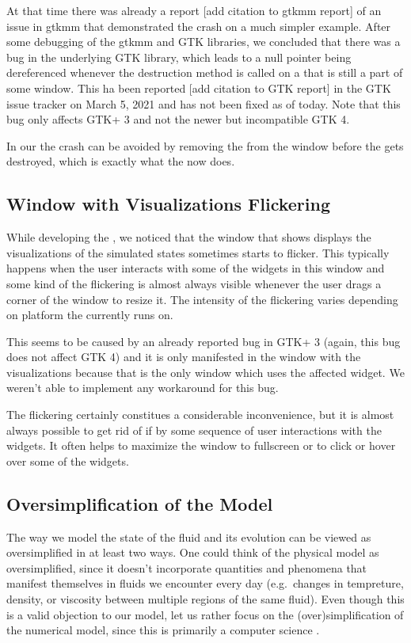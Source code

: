 \documentclass[11pt,a4paper,twoside,openright]{report}
\begin{document}
At that time there was already a report [add citation to gtkmm report] of an issue in gtkmm that demonstrated the crash on a much simpler example. After some debugging of the gtkmm and GTK libraries, we concluded that there was a bug in the underlying GTK library, which leads to a null pointer being dereferenced whenever the destruction method is called on a  that is still a part of some window. This ha been reported [add citation to GTK report] in the GTK issue tracker on March 5, 2021 and has not been fixed as of today. Note that this bug only affects GTK+ 3 and not the newer but incompatible GTK 4.

In our \software{} the crash can be avoided by removing the  from the window before the  gets destroyed, which is exactly what the \software{} now does.

\subsection{Window with Visualizations Flickering}
While developing the \software{}, we noticed that the window that shows displays the visualizations of the simulated states sometimes starts to flicker. This typically happens when the user interacts with some of the widgets in this window and some kind of the flickering is almost always visible whenever the user drags a corner of the window to resize it. The intensity of the flickering varies depending on platform the \software{} currently runs on.

This seems to be caused by an already reported bug in GTK+ 3 (again, this bug does not affect GTK 4) and it is only manifested in the window with the visualizations because that is the only window which uses the affected  widget. We weren't able to implement any workaround for this bug.

The flickering certainly constitues a considerable inconvenience, but it is almost always possible to get rid of if by some sequence of user interactions with the widgets. It often helps to maximize the window to fullscreen or to click or hover over some of the widgets.

\subsection{Oversimplification of the Model}
The way we model the state of the fluid and its evolution can be viewed as oversimplified in at least two ways. One could think of the physical model as oversimplified, since it doesn't incorporate quantities and phenomena that manifest themselves in fluids we encounter every day (e.g.\ changes in tempreture, density, or viscosity between multiple regions of the same fluid). Even though this is a valid objection to our model, let us rather focus on the (over)simplification of the numerical model, since this \this{} is primarily a computer science \this{}.
\end{document}
